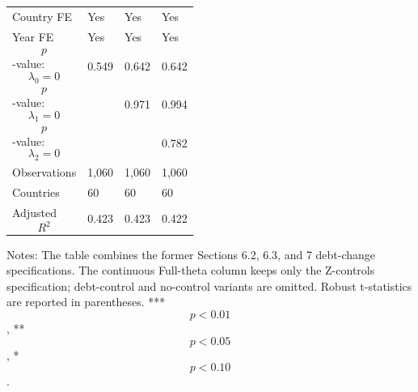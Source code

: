 \begin{table}[H]
\begin{threeparttable}
\begin{tabularx}{\textwidth}{lYYY}
Country FE & Yes & Yes & Yes \\
Year FE & Yes & Yes & Yes \\
$$p$$-value: $$\lambda_0=0$$ & 0.549 & 0.642 & 0.642 \\
$$p$$-value: $$\lambda_1=0$$ &  & 0.971 & 0.994 \\
$$p$$-value: $$\lambda_2=0$$ &  &  & 0.782 \\
Observations & 1,060 & 1,060 & 1,060 \\
Countries & 60 & 60 & 60 \\
Adjusted $$R^2$$ & 0.423 & 0.423 & 0.422 \\
\bottomrule
\end{tabularx}
\begin{tablenotes}[flushleft]\footnotesize
\item Notes: The table combines the former Sections 6.2, 6.3, and 7 debt-change specifications. The continuous Full-theta column keeps only the Z-controls specification; debt-control and no-control variants are omitted. Robust t-statistics are reported in parentheses. *** $$p<0.01$$, ** $$p<0.05$$, * $$p<0.10$$.
\end{tablenotes}
\end{threeparttable}
\end{table}

